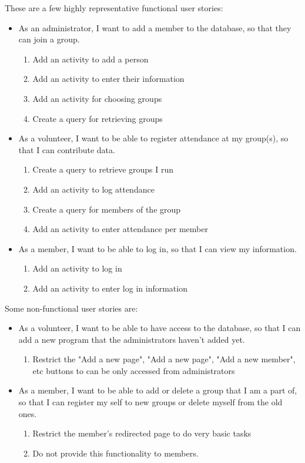 \documentclass{l3proj}
\begin{document}
These are a few highly representative functional user stories:
\begin{itemize}
\item As an administrator, I want to add a member to the database, so that they can join a group.

\begin{enumerate}
\item Add an activity to add a person
\item Add an activity to enter their information
\item Add an activity for choosing groups
\item Create a query for retrieving groups
\end{enumerate}

\item As a volunteer, I want to be able to register attendance at my group(s), so that I can contribute data.

\begin{enumerate}
\item Create a query to retrieve groups I run
\item Add an activity to log attendance
\item Create a query for members of the group
\item Add an activity to enter attendance per member
\end{enumerate}

\item As a member, I want to be able to log in, so that I can view my information.

\begin{enumerate}
\item Add an activity to log in
\item Add an activity to enter log in information
\end{enumerate}
\end{itemize}

Some non-functional user stories are:

\begin{itemize}
\item As a volunteer, I want to be able to have access to the database, so that I can add a new program that the administrators haven't added yet.

\begin{enumerate}
\item Restrict the "Add a new page", "Add a new page", "Add a new member", etc buttons to can be only accessed from administrators
\end{enumerate}

\item As a member, I want to be able to add or delete a group that I am a part of, so that I can register my self to new groups or delete myself from the old ones.

\begin{enumerate}
\item Restrict the member's redirected page to do very basic tasks
\item Do not provide this functionality to members.
\end{enumerate}
\end{itemize}
\end{document}
